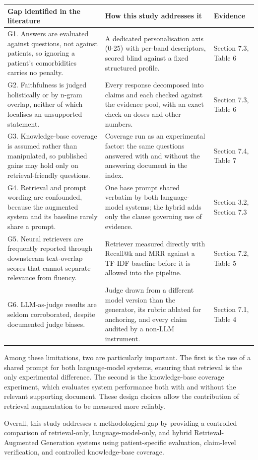 \label{tab:2}
\begin{center}
\scriptsize
\setlength{\tabcolsep}{4pt}
\begin{tabular}{>{\raggedright\arraybackslash}p{}>{\raggedright\arraybackslash}p{}>{\raggedright\arraybackslash}p{}}
\toprule
\textbf{Gap identified in the literature} & \textbf{How this study addresses it} & \textbf{Evidence} \\
\midrule
G1. Answers are evaluated against questions, not against patients, so ignoring a patient's comorbidities carries no penalty. & A dedicated personalisation axis (0-25) with per-band descriptors, scored blind against a fixed structured profile. & Section 7.3, Table 6 \\
G2. Faithfulness is judged holistically or by n-gram overlap, neither of which localises an unsupported statement. & Every response decomposed into claims and each checked against the evidence pool, with an exact check on doses and other numbers. & Section 7.3, Table 6 \\
G3. Knowledge-base coverage is assumed rather than manipulated, so published gains may hold only on retrieval-friendly questions. & Coverage run as an experimental factor: the same questions answered with and without the answering document in the index. & Section 7.4, Table 7 \\
G4. Retrieval and prompt wording are confounded, because the augmented system and its baseline rarely share a prompt. & One base prompt shared verbatim by both language-model systems; the hybrid adds only the clause governing use of evidence. & Section 3.2, Section 7.3 \\
G5. Neural retrievers are frequently reported through downstream text-overlap scores that cannot separate relevance from fluency. & Retriever measured directly with Recall@k and MRR against a TF-IDF baseline before it is allowed into the pipeline. & Section 7.2, Table 5 \\
G6. LLM-as-judge results are seldom corroborated, despite documented judge biases. & Judge drawn from a different model version than the generator, its rubric ablated for anchoring, and every claim audited by a non-LLM instrument. & Section 7.1, Table 4 \\
\bottomrule
\end{tabular}
\end{center}

Among these limitations, two are particularly important. The first is the use of a shared prompt for both language-model systems, ensuring that retrieval is the only experimental difference. The second is the knowledge-base coverage experiment, which evaluates system performance both with and without the relevant supporting document. These design choices allow the contribution of retrieval augmentation to be measured more reliably.

Overall, this study addresses a methodological gap by providing a controlled comparison of retrieval-only, language-model-only, and hybrid Retrieval-Augmented Generation systems using patient-specific evaluation, claim-level verification, and controlled knowledge-base coverage.
